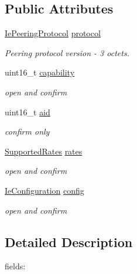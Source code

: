 \subsection*{Public Attributes}
\begin{DoxyCompactItemize}
\item 
\hyperlink{classns3_1_1dot11s_1_1IePeeringProtocol}{Ie\+Peering\+Protocol} \hyperlink{structns3_1_1dot11s_1_1PeerLinkConfirmStart_1_1PlinkConfirmStartFields_aca5791134d7b4ce665a80cbd5d0d2018}{protocol}
\begin{DoxyCompactList}\small\item\em Peering protocol version -\/ 3 octets. \end{DoxyCompactList}\item 
uint16\+\_\+t \hyperlink{structns3_1_1dot11s_1_1PeerLinkConfirmStart_1_1PlinkConfirmStartFields_aca7e1f786dbafa35bc8e938555856c00}{capability}
\begin{DoxyCompactList}\small\item\em open and confirm \end{DoxyCompactList}\item 
uint16\+\_\+t \hyperlink{structns3_1_1dot11s_1_1PeerLinkConfirmStart_1_1PlinkConfirmStartFields_a26c1e61e6d20609105857d6c5e0b4e66}{aid}
\begin{DoxyCompactList}\small\item\em confirm only \end{DoxyCompactList}\item 
\hyperlink{classns3_1_1SupportedRates}{Supported\+Rates} \hyperlink{structns3_1_1dot11s_1_1PeerLinkConfirmStart_1_1PlinkConfirmStartFields_a0668faf13fbebdcdac4843fd3e1e3df6}{rates}
\begin{DoxyCompactList}\small\item\em open and confirm \end{DoxyCompactList}\item 
\hyperlink{classns3_1_1dot11s_1_1IeConfiguration}{Ie\+Configuration} \hyperlink{structns3_1_1dot11s_1_1PeerLinkConfirmStart_1_1PlinkConfirmStartFields_a895b407b26876bb0e739c3235d75b3c9}{config}
\begin{DoxyCompactList}\small\item\em open and confirm \end{DoxyCompactList}\end{DoxyCompactItemize}


\subsection{Detailed Description}
fields\+: 

